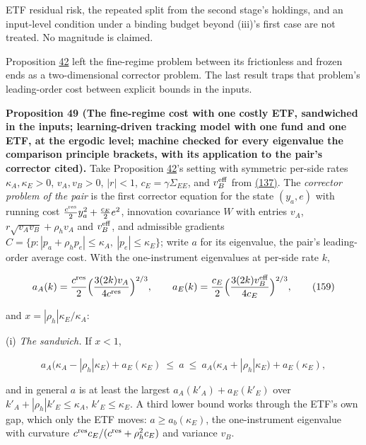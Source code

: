 \documentclass[11pt]{article}
\begin{document}
ETF residual risk, the repeated split from the second stage's holdings,
and an input-level condition under a binding budget beyond (iii)'s
first case are not treated. No magnitude is claimed.

Proposition \hyperref[res:Proposition-42]{42} left the fine-regime problem between its frictionless
and frozen ends as a two-dimensional corrector problem. The last
result traps that problem's leading-order cost between explicit bounds
in the inputs.

\label{res:Proposition-49}
\textbf{Proposition 49 (The fine-regime cost with one costly ETF, sandwiched in the inputs; learning-driven tracking model with one fund and one ETF, at the ergodic level; machine checked for every eigenvalue the comparison principle brackets, with its application to the pair's corrector cited).}
Take Proposition \hyperref[res:Proposition-42]{42}'s setting with symmetric per-side rates
\(\kappa_A,\kappa_E>0\), \(v_A,v_B>0\), \(|r|<1\), \(c_E=\gamma\Sigma_{EE}\), and \(v_B^{\rm eff}\) from
\hyperref[eq:137]{(137)}. The \emph{corrector problem of the pair} is the first corrector
equation for the state \((y_a,e)\) with running cost \(\frac{c^{\rm res}}2y_a^2+\frac{c_E}2e^2\),
innovation covariance \(W\) with entries \(v_A\), \(r\sqrt{v_Av_B}+\rho_hv_A\) and
\(v_B^{\rm eff}\), and admissible gradients
\(C=\{p:|p_a+\rho_hp_e|\leq\kappa_A,\ |p_e|\leq\kappa_E\}\); write \(a\) for its eigenvalue, the
pair's leading-order average cost. With the one-instrument eigenvalues
at per-side rate \(k\),

\begin{equation*}
a_A(k)=\frac{c^{\rm res}}2\Bigl(\frac{3(2k)v_A}{4c^{\rm res}}\Bigr)^{2/3},\qquad
a_E(k)=\frac{c_E}2\Bigl(\frac{3(2k)v_B^{\rm eff}}{4c_E}\Bigr)^{2/3},\tag{159}\label{eq:159}
\end{equation*}

and \(x=|\rho_h|\kappa_E/\kappa_A\):

(i) \emph{The sandwich.} If \(x<1\),

\begin{equation*}
a_A\bigl(\kappa_A-|\rho_h|\kappa_E\bigr)+a_E(\kappa_E)\ \leq\ a\ \leq\ a_A\bigl(\kappa_A+|\rho_h|\kappa_E\bigr)+a_E(\kappa_E),\tag{160}\label{eq:160}
\end{equation*}

and in general \(a\) is at least the largest \(a_A(k'_A)+a_E(k'_E)\) over
\(k'_A+|\rho_h|k'_E\leq\kappa_A\), \(k'_E\leq\kappa_E\). A third lower bound works through the
ETF's own gap, which only the ETF moves: \(a\geq a_b(\kappa_E)\), the
one-instrument eigenvalue with curvature \(c^{\rm res}c_E/(c^{\rm res}+\rho_h^2c_E)\) and
variance \(v_B\).
\end{document}
